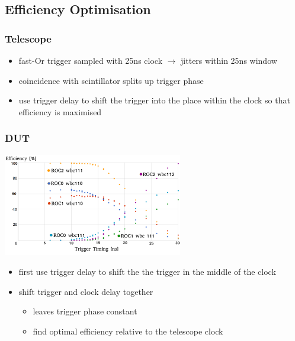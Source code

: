 \documentclass[9pt]{beamer}
\begin{document}
\subsection{Efficiency Optimisation}
\begin{frame}
	\frametitle{Telescope}
	\begin{itemize}
		\item fast-Or trigger sampled with 25ns clock $\rightarrow$ jitters within 25ns window
		\item coincidence with scintillator splits up trigger phase
		\item use trigger delay to shift the trigger into the place within the clock so that efficiency is maximised
	\end{itemize}
\end{frame}
\begin{frame}
	\frametitle{DUT}
	\begin{center}
		\includegraphics[height=4.5cm]{Pics/optimisation}
	\end{center}
	\begin{itemize}
		\item first use trigger delay to shift the the trigger in the middle of the clock
		\item shift trigger and clock delay together
		\begin{itemize}
			\item leaves trigger phase constant
			\item find optimal efficiency relative to the telescope clock
		\end{itemize}

	\end{itemize}
\end{frame}
\end{document}
